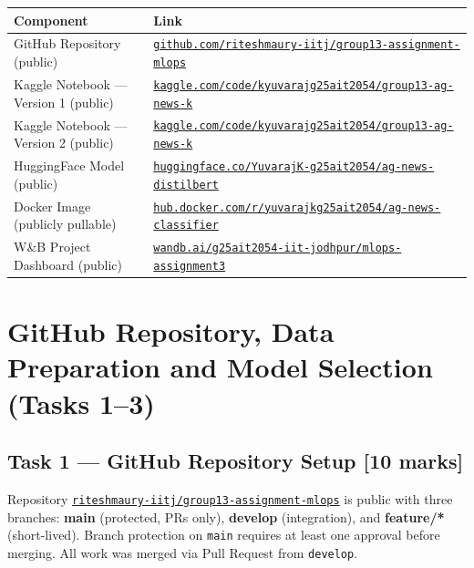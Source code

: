 \documentclass[11pt,a4paper]{article}
\begin{document}
\vspace{0.2cm}
\renewcommand{\arraystretch}{1.4}
\begin{tabular}{p{5cm}p{9.5cm}}
\toprule
\textbf{Component} & \textbf{Link} \\
\midrule
GitHub Repository (public) & \href{https://github.com/riteshmaury-iitj/group13-assignment-mlops}{\small\texttt{github.com/riteshmaury-iitj/group13-assignment-mlops}} \\
Kaggle Notebook --- Version 1 (public) & \href{https://www.kaggle.com/code/kyuvarajg25ait2054/group13-ag-news-k}{\small\texttt{kaggle.com/code/kyuvarajg25ait2054/group13-ag-news-k}} \\
Kaggle Notebook --- Version 2 (public) & \href{https://www.kaggle.com/code/kyuvarajg25ait2054/group13-ag-news-k}{\small\texttt{kaggle.com/code/kyuvarajg25ait2054/group13-ag-news-k}} \\
HuggingFace Model (public) & \href{https://huggingface.co/YuvarajK-g25ait2054/ag-news-distilbert}{\small\texttt{huggingface.co/YuvarajK-g25ait2054/ag-news-distilbert}} \\
Docker Image (publicly pullable) & \href{https://hub.docker.com/r/yuvarajkg25ait2054/ag-news-classifier}{\small\texttt{hub.docker.com/r/yuvarajkg25ait2054/ag-news-classifier}} \\
W\&B Project Dashboard (public) & \href{https://wandb.ai/g25ait2054-iit-jodhpur/mlops-assignment3}{\small\texttt{wandb.ai/g25ait2054-iit-jodhpur/mlops-assignment3}} \\
\bottomrule
\end{tabular}

\newpage

\section{GitHub Repository, Data Preparation and Model Selection (Tasks 1--3)}

\subsection{Task 1 --- GitHub Repository Setup [10 marks]}

Repository \href{https://github.com/riteshmaury-iitj/group13-assignment-mlops}{\texttt{riteshmaury-iitj/group13-assignment-mlops}} is public with three branches: \textbf{main} (protected, PRs only), \textbf{develop} (integration), and \textbf{feature/*} (short-lived). Branch protection on \texttt{main} requires at least one approval before merging. All work was merged via Pull Request from \texttt{develop}.
\end{document}
